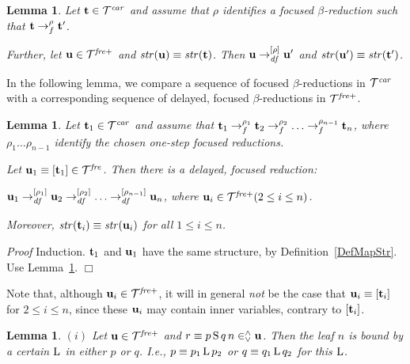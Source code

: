 \documentclass{article}
\theoremstyle{plain}
\newtheorem{Lem}[The]{Lemma}
\theoremstyle{definition}
\begin{document}
{\begin{Lem}\label{LemStrRed}
Let ${\bf t} \in {\cal T}^{\it car}$ and assume that $\rho$ identifies a focused $\beta$-reduction such that ${\bf t} \rightarrow_f^\rho {\bf t}'$.

Further, let ${\bf u} \in {\cal T}^{\it fre+}$ and ${\it str}({\bf u}) \equiv {\it str}({\bf t})$. Then ${\bf u} \rightarrow_{\it df}^{[\rho]} {\bf u}'$ and ${\it str}({\bf u}') \equiv {\it str}({\bf t}')$.
\end{Lem}



In the following lemma, we compare a sequence of focused $\beta$-reductions in ${\cal T}^{\it car}$ with a corresponding sequence of delayed, focused $\beta$-reductions in ${\cal T}^{\it fre+}$.

\begin{Lem}\label{LemVarLes} Let ${\bf t}_1 \in {\cal T}^{\it car}$ and assume that ${\bf t}_1 \rightarrow_{f}^{\rho_1} {\bf t}_2 \rightarrow_{f}^{\rho_2} \ldots \rightarrow_{f}^{\rho_{n-1}} {\bf t}_n$, where $\rho_1 \ldots \rho_{n-1}$ identify  the chosen one-step focused reductions.

Let ${\bf u}_1 \equiv [{\bf t}_1] \in {\cal T}^{\it fre}$. Then there is a delayed, focused reduction:

${\bf u}_1 \rightarrow_{\it df}^{[\rho_1]} {\bf u}_2 \rightarrow_{\it df}^{[\rho_2]} \ldots \rightarrow_{\it df}^{[\rho_{n-1}]} {\bf u}_n$, where ${\bf u}_i \in {\cal T}^{\it fre+} (2 \leq i \leq n)$.

Moreover, ${\it str}({\bf t}_i) \equiv {\it str}({\bf u}_i)$ for all $1 \leq i \leq n$.

\end{Lem}

{\it Proof\/} Induction. ${\bf t}_1$ and ${\bf u}_1$ have the same structure, by Definition~\ref{DefMapStr}. Use Lemma~\ref{LemStrRed}. $\Box$

\smallskip

Note that, although ${\bf u}_i \in {\cal T}^{\it fre+}$, it will in general {\em not\/} be the case that ${\bf u}_i \equiv [{\bf t}_i]$ for $2 \leq i \leq n$, since these ${\bf u}_i$ may contain inner variables, contrary to $[{\bf t}_i]$.



\begin{Lem}\label{LemAblBou}
$(i)$ Let ${\bf u} \in {\cal T}^{\it fre+}$ and $r \equiv p \, {\rm S} \, q \, n \in^\wedge_\vee {\bf u}$. Then the leaf $n$ is bound by a certain ${\rm L}$ in either $p$ or $q$. I.e., $p \equiv p_1 \, {\rm L} \, p_2$ or $q \equiv q_1 \, {\rm L} \, q_2$ for this ${\rm L}$.


\end{Lem}}
\end{document}
